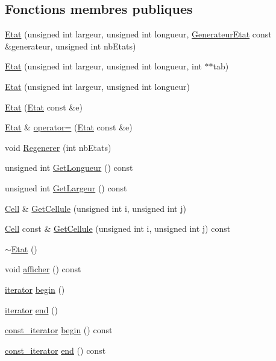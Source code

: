 \subsection*{Fonctions membres publiques}
\begin{DoxyCompactItemize}
\item 
\mbox{\hyperlink{class_etat_a419cff1c3aa750391d0aa71fe0c84446}{Etat}} (unsigned int largeur, unsigned int longueur, \mbox{\hyperlink{class_generateur_etat}{Generateur\+Etat}} const \&generateur, unsigned int nb\+Etats)
\item 
\mbox{\hyperlink{class_etat_acc2fe2fb0e0cb2d42a129d1da6ce1363}{Etat}} (unsigned int largeur, unsigned int longueur, int $\ast$$\ast$tab)
\item 
\mbox{\hyperlink{class_etat_a690a6c35d4d7fedecfe918de910abdde}{Etat}} (unsigned int largeur, unsigned int longueur)
\item 
\mbox{\hyperlink{class_etat_a21ca902ddcaf660a4d8ab6a0b5daa414}{Etat}} (\mbox{\hyperlink{class_etat}{Etat}} const \&e)
\item 
\mbox{\hyperlink{class_etat}{Etat}} \& \mbox{\hyperlink{class_etat_a3879d6c9ced28962cc79632dfb0abd84}{operator=}} (\mbox{\hyperlink{class_etat}{Etat}} const \&e)
\item 
void \mbox{\hyperlink{class_etat_ad8cd3d55140d2b46784cb7623e998ee4}{Regenerer}} (int nb\+Etats)
\item 
unsigned int \mbox{\hyperlink{class_etat_ac0ecddd03a3429934f91a0fb44ef071e}{Get\+Longueur}} () const
\item 
unsigned int \mbox{\hyperlink{class_etat_a6c67137de7313e23c40a77f10417c70e}{Get\+Largeur}} () const
\item 
\mbox{\hyperlink{class_cell}{Cell}} \& \mbox{\hyperlink{class_etat_acff1910bf647fb62c9f4d9e726be7290}{Get\+Cellule}} (unsigned int i, unsigned int j)
\item 
\mbox{\hyperlink{class_cell}{Cell}} const  \& \mbox{\hyperlink{class_etat_ab1d86c7e7e812d434057ed88848cc7f6}{Get\+Cellule}} (unsigned int i, unsigned int j) const
\item 
\mbox{\hyperlink{class_etat_ae3c7932b18a7da0f8cf85f7527ba744e}{$\sim$\+Etat}} ()
\item 
void \mbox{\hyperlink{class_etat_aeb0c23cfb166db846e567466dae0ebd1}{afficher}} () const
\item 
\mbox{\hyperlink{class_etat_1_1iterator}{iterator}} \mbox{\hyperlink{class_etat_ad158b354ea61ec2f0577e801ebdef02d}{begin}} ()
\item 
\mbox{\hyperlink{class_etat_1_1iterator}{iterator}} \mbox{\hyperlink{class_etat_a20bb403d8e9e056511559ecd2090c458}{end}} ()
\item 
\mbox{\hyperlink{class_etat_1_1const__iterator}{const\+\_\+iterator}} \mbox{\hyperlink{class_etat_ac19ab230b9856966eb149364c8045065}{begin}} () const
\item 
\mbox{\hyperlink{class_etat_1_1const__iterator}{const\+\_\+iterator}} \mbox{\hyperlink{class_etat_a513101fc8bbb4b60e69b36013fc2b126}{end}} () const
\end{DoxyCompactItemize}
